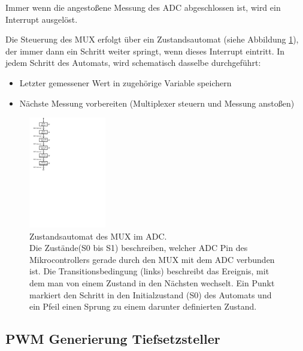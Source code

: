 \documentclass[a4paper, 11pt]{report}
\begin{document}
		Immer wenn die angestoßene Messung des ADC abgeschlossen ist, wird ein Interrupt ausgelöst.

		Die Steuerung des MUX erfolgt über ein Zustandsautomat (siehe Abbildung \ref{img:ADCMUX}), der immer dann ein Schritt weiter springt, wenn dieses Interrupt eintritt. In jedem Schritt des Automats, wird schematisch dasselbe durchgeführt:
		\begin{itemize}
		\item	Letzter gemessener Wert in zugehörige Variable speichern
		\item Nächste Messung vorbereiten (Multiplexer steuern und Messung anstoßen)
		\end{itemize}

		\begin{figure}[ht]
			\centering
			\includegraphics[width=0.3\textwidth]{rec/ADCAutomat.pdf}
			\caption[Zustandsautomat des MUX im ADC]{Zustandsautomat des MUX im ADC.\\Die Zustände(S0 bis S1) beschreiben, welcher ADC Pin des Mikrocontrollers gerade durch den MUX mit dem ADC verbunden ist. Die Transitionsbedingung (links) beschreibt das Ereignis, mit dem man von einem Zustand in den Nächsten wechselt. Ein Punkt markiert den Schritt in den Initialzustand (S0) des Automats und ein Pfeil einen Sprung zu einem darunter definierten Zustand.}
			\label{img:ADCMUX}
		\end{figure}

\subsection{PWM Generierung Tiefsetzsteller}\label{subsec:PWM}
\end{document}
